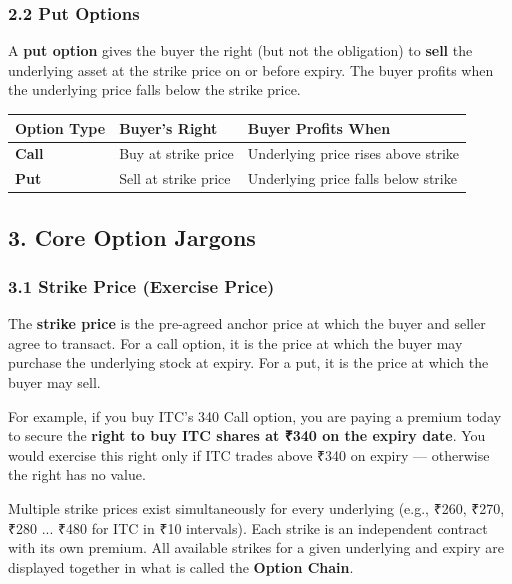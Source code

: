 \documentclass[12pt,openany]{book}
\begin{document}
\subsubsection{2.2 Put Options}

A \textbf{put option} gives the buyer the right (but not the obligation) to \textbf{sell} the underlying asset at the strike price on or before expiry. The buyer profits when the underlying price falls below the strike price.

\begin{center}
\scriptsize
\setlength{\tabcolsep}{3pt}
\begin{tabular}{|L{4.40cm}|L{4.40cm}|L{4.40cm}|}
\hline
Option Type & Buyer's Right & Buyer Profits When \\
\hline
\textbf{Call} & Buy at strike price & Underlying price rises above strike \\
\hline
\textbf{Put} & Sell at strike price & Underlying price falls below strike \\
\hline
\end{tabular}
\end{center}

\subsection{3. Core Option Jargons}

\subsubsection{3.1 Strike Price (Exercise Price)}

The \textbf{strike price} is the pre-agreed anchor price at which the buyer and seller agree to transact. For a call option, it is the price at which the buyer may purchase the underlying stock at expiry. For a put, it is the price at which the buyer may sell.

For example, if you buy ITC's 340 Call option, you are paying a premium today to secure the \textbf{right to buy ITC shares at ₹340 on the expiry date}. You would exercise this right only if ITC trades above ₹340 on expiry — otherwise the right has no value.

Multiple strike prices exist simultaneously for every underlying (e.g., ₹260, ₹270, ₹280 ... ₹480 for ITC in ₹10 intervals). Each strike is an independent contract with its own premium. All available strikes for a given underlying and expiry are displayed together in what is called the \textbf{Option Chain}.
\end{document}
